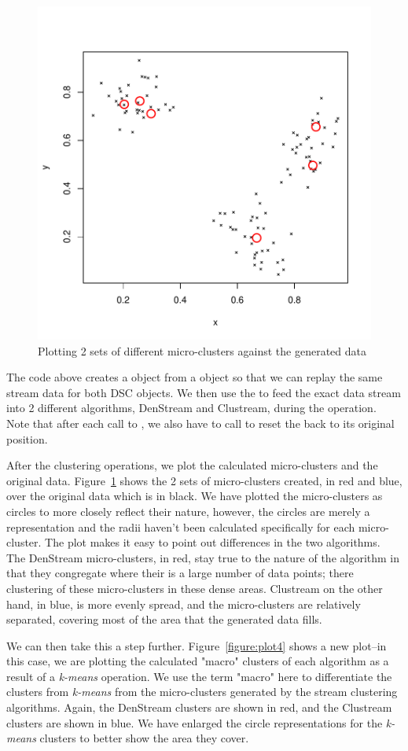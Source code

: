 \documentclass[nojss]{jss}
\begin{document}
\begin{figure}
\centering
\includegraphics[width=.5\linewidth]{stream-plot3}
\caption{Plotting 2 sets of different micro-clusters against the generated data}
\label{figure:plot3}
\end{figure}

The code above creates a  object from a  object so that we can replay the same stream data for both DSC objects. We then use the  to feed the exact data stream into 2 different algorithms, DenStream and Clustream, during the  operation. Note that after each call to , we also have to call  to reset the  back to its original position.


After the clustering operations, we plot the calculated micro-clusters and the original data. Figure~\ref{figure:plot3} shows the 2 sets of micro-clusters created, in red and blue, over the original data which is in black. We have plotted the micro-clusters as circles to more closely reflect their nature, however, the circles are merely a representation and the radii haven't been calculated specifically for each micro-cluster. The plot makes it easy to point out differences in the two algorithms. The DenStream micro-clusters, in red, stay true to the nature of the algorithm in that they congregate where their is a large number of data points; there clustering of these micro-clusters in these dense areas. Clustream on the other hand, in blue, is more evenly spread, and the micro-clusters are relatively separated, covering most of the area that the generated data fills.


We can then take this a step further. Figure~\ref{figure:plot4} shows a new plot--in this case, we are plotting the calculated "macro" clusters of each algorithm as a result of a \textit{k-means} operation. We use the term "macro" here to differentiate the clusters from \textit{k-means} from the micro-clusters generated by the stream clustering algorithms. Again, the DenStream clusters are shown in red, and the Clustream clusters are shown in blue. We have enlarged the circle representations for the \textit{k-means} clusters to better show the area they cover.
\end{document}
